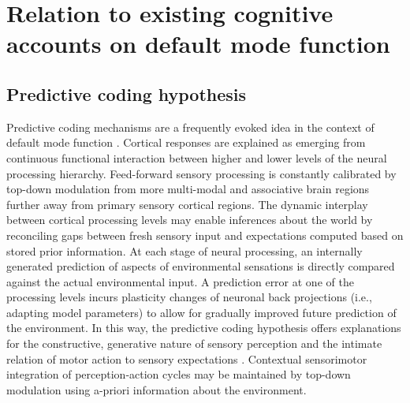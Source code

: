 \documentclass[10pt,letterpaper]{article}
\begin{document}
\section{Relation to existing cognitive accounts on default mode function}
\subsection{Predictive coding hypothesis}
Predictive coding mechanisms
\citep{clark2013whatever, friston2008hierarchical}
are a frequently evoked idea in the context of default mode function
\citep{bar2007}.
Cortical responses are explained as
emerging from continuous functional interaction between
higher and lower levels of the neural processing hierarchy.
Feed-forward sensory processing is constantly calibrated by
top-down modulation from more multi-modal and associative brain regions
further away from primary sensory cortical regions.
The dynamic interplay between cortical processing levels
may enable inferences about the world by reconciling
gaps between fresh sensory input and expectations computed
based on stored prior information.
At each stage of neural processing,
an internally generated prediction of aspects of environmental sensations is
directly compared against the actual environmental input.
A prediction error at one of the processing levels
incurs plasticity changes of neuronal back projections
(i.e., adapting model parameters)
to allow for gradually improved future prediction of the environment.
In this way,
the predictive coding hypothesis offers explanations for
the constructive, generative nature of sensory perception
\citep{friston2010free} and
the intimate relation of motor action to sensory expectations
\citep{wolpert1995internal, kording2004bayesian}.
Contextual sensorimotor integration of perception-action cycles
may be maintained by top-down modulation
using a-priori information about the environment.
\end{document}
